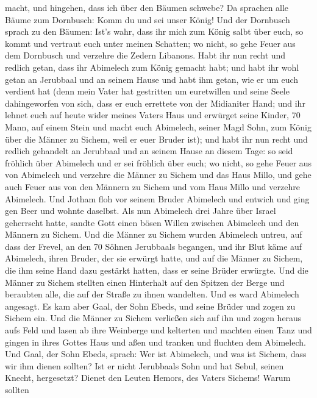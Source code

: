macht, und hingehen, dass ich über den Bäumen schwebe?  Da
sprachen alle Bäume zum Dornbusch: Komm du und sei unser König!
 Und der Dornbusch sprach zu den Bäumen: Ist's wahr, dass
ihr mich zum König salbt über euch, so kommt und vertraut euch unter
meinen Schatten; wo nicht, so gehe Feuer aus dem Dornbusch und verzehre
die Zedern Libanons.  Habt ihr nun recht und redlich getan,
dass ihr Abimelech zum König gemacht habt; und habt ihr wohl getan an
Jerubbaal und an seinem Hause und habt ihm getan, wie er um euch
verdient hat  (denn mein Vater hat gestritten um
euretwillen und seine Seele dahingeworfen von sich, dass er euch
errettete von der Midianiter Hand;  und ihr lehnet euch auf
heute wider meines Vaters Haus und erwürget seine Kinder, 70 Mann, auf
einem Stein und macht euch Abimelech, seiner Magd Sohn, zum König über
die Männer zu Sichem, weil er euer Bruder ist);  und habt
ihr nun recht und redlich gehandelt an Jerubbaal und an seinem Hause an
diesem Tage: so seid fröhlich über Abimelech und er sei fröhlich über
euch;  wo nicht, so gehe Feuer aus von Abimelech und
verzehre die Männer zu Sichem und das Haus Millo, und gehe auch Feuer
aus von den Männern zu Sichem und vom Haus Millo und verzehre Abimelech.
 Und Jotham floh vor seinem Bruder Abimelech und entwich
und ging gen Beer und wohnte daselbst.  Als nun Abimelech
drei Jahre über Israel geherrscht hatte,  sandte Gott einen
bösen Willen zwischen Abimelech und den Männern zu Sichem. Und die
Männer zu Sichem wurden Abimelech untreu,  auf dass der
Frevel, an den 70 Söhnen Jerubbaals begangen, und ihr Blut käme auf
Abimelech, ihren Bruder, der sie erwürgt hatte, und auf die Männer zu
Sichem, die ihm seine Hand dazu gestärkt hatten, dass er seine Brüder
erwürgte.  Und die Männer zu Sichem stellten einen
Hinterhalt auf den Spitzen der Berge und beraubten alle, die auf der
Straße zu ihnen wandelten. Und es ward Abimelech angesagt. 
Es kam aber Gaal, der Sohn Ebeds, und seine Brüder und zogen zu Sichem
ein. Und die Männer zu Sichem verließen sich auf ihn  und
zogen heraus aufs Feld und lasen ab ihre Weinberge und kelterten und
machten einen Tanz und gingen in ihres Gottes Haus und aßen und tranken
und fluchten dem Abimelech.  Und Gaal, der Sohn Ebeds,
sprach: Wer ist Abimelech, und was ist Sichem, dass wir ihm dienen
sollten? Ist er nicht Jerubbaals Sohn und hat Sebul, seinen Knecht,
hergesetzt? Dienet den Leuten Hemors, des Vaters Sichems! Warum sollten
